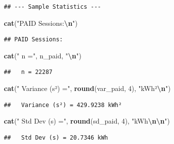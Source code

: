 \documentclass[
  12pt,
]{article}
\newenvironment{Shaded}{\begin{snugshade}}{\end{snugshade}}
\newcommand{\DecValTok}[1]{\textcolor[rgb]{0.00,0.00,0.81}{#1}}
\newcommand{\FunctionTok}[1]{\textcolor[rgb]{0.13,0.29,0.53}{\textbf{#1}}}
\newcommand{\NormalTok}[1]{#1}
\newcommand{\SpecialCharTok}[1]{\textcolor[rgb]{0.81,0.36,0.00}{\textbf{#1}}}
\newcommand{\StringTok}[1]{\textcolor[rgb]{0.31,0.60,0.02}{#1}}
\begin{document}
\begin{verbatim}
## --- Sample Statistics ---
\end{verbatim}

\begin{Shaded}
\begin{Highlighting}[]
\FunctionTok{cat}\NormalTok{(}\StringTok{"PAID Sessions:}\SpecialCharTok{\textbackslash{}n}\StringTok{"}\NormalTok{)}
\end{Highlighting}
\end{Shaded}

\begin{verbatim}
## PAID Sessions:
\end{verbatim}

\begin{Shaded}
\begin{Highlighting}[]
\FunctionTok{cat}\NormalTok{(}\StringTok{"  n ="}\NormalTok{, n\_paid, }\StringTok{"}\SpecialCharTok{\textbackslash{}n}\StringTok{"}\NormalTok{)}
\end{Highlighting}
\end{Shaded}

\begin{verbatim}
##   n = 22287
\end{verbatim}

\begin{Shaded}
\begin{Highlighting}[]
\FunctionTok{cat}\NormalTok{(}\StringTok{"  Variance (s²) ="}\NormalTok{, }\FunctionTok{round}\NormalTok{(var\_paid, }\DecValTok{4}\NormalTok{), }\StringTok{"kWh²}\SpecialCharTok{\textbackslash{}n}\StringTok{"}\NormalTok{)}
\end{Highlighting}
\end{Shaded}

\begin{verbatim}
##   Variance (s²) = 429.9238 kWh²
\end{verbatim}

\begin{Shaded}
\begin{Highlighting}[]
\FunctionTok{cat}\NormalTok{(}\StringTok{"  Std Dev (s) ="}\NormalTok{, }\FunctionTok{round}\NormalTok{(sd\_paid, }\DecValTok{4}\NormalTok{), }\StringTok{"kWh}\SpecialCharTok{\textbackslash{}n\textbackslash{}n}\StringTok{"}\NormalTok{)}
\end{Highlighting}
\end{Shaded}

\begin{verbatim}
##   Std Dev (s) = 20.7346 kWh
\end{verbatim}
\end{document}

